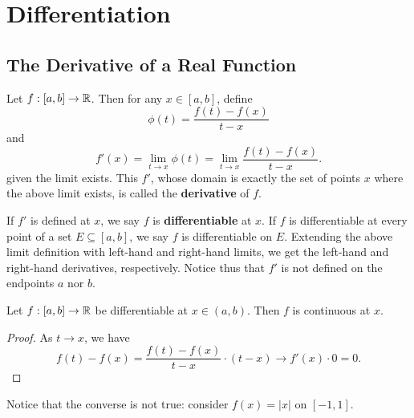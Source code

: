 
\chapter{Differentiation}

\section{The Derivative of a Real Function}

\begin{definition} %
    Let $f: [a, b] \rightarrow \mathbb{R}$. Then for any $x \in [a, b]$, define
    \[
        \phi(t) = \frac{f(t) - f(x)}{t - x}
    \]
    and
    \[
        f'(x) = \lim_{t \to x} \phi(t) = \lim_{t \to x} \frac{f(t) - f(x)}{t - x}.
    \]
    given the limit exists. This $f'$, whose domain is exactly the set of points $x$ where the above limit exists, is called the \textbf{derivative} of $f$.

    If $f'$ is defined at $x$, we say $f$ is \textbf{differentiable} at $x$. If $f$ is differentiable at every point of a set $E \subseteq [a, b]$, we say $f$ is differentiable on $E$. Extending the above limit definition with left-hand and right-hand limits, we get the left-hand and right-hand derivatives, respectively. Notice thus that $f'$ is not defined on the endpoints $a$ nor $b$.
\end{definition}

\begin{theorem} %
    Let $f : [a, b] \rightarrow \mathbb{R}$ be differentiable at $x \in (a, b)$. Then $f$ is continuous at $x$. 

    \begin{proof}
        As $t \to x$, we have
        \[
            f(t) - f(x) = \frac{f(t) - f(x)}{t - x} \cdot (t - x) \to f'(x) \cdot 0 = 0.
        \]
    \end{proof}

    Notice that the converse is not true: consider $f(x) = |x|$ on $[-1, 1]$.
\end{theorem}

